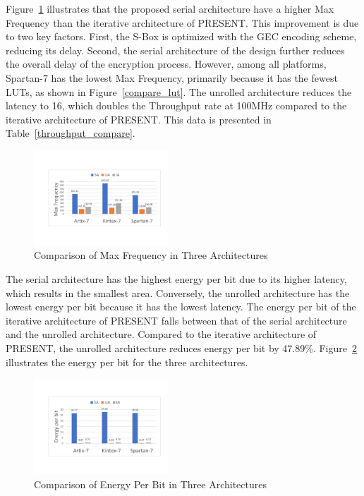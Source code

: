 \documentclass[final,5p,times,twocolumn]{elsarticle}
\begin{document}
Figure~\ref{compare-maxF} illustrates that the proposed serial architecture have a higher Max Frequency than the iterative architecture of PRESENT. This improvement is due to two key factors. First, the S-Box is optimized with the GEC encoding scheme, reducing its delay. Second, the serial architecture of the design further reduces the overall delay of the encryption process. However, among all platforms, Spartan-7 has the lowest Max Frequency, primarily because it has the fewest LUTs, as shown in Figure~\ref{compare_lut}. The unrolled architecture reduces the latency to 16, which doubles the Throughput rate at 100MHz compared to the iterative architecture of PRESENT. This data is presented in Table~\ref{throughput_compare}.

\begin{figure}
    \centering
    \includegraphics[width=0.45\textwidth]{./fig/compare-maxf.pdf}
    \caption{Comparison of Max Frequency in Three Architectures}\label{compare-maxF}
\end{figure}

The serial architecture has the highest energy per bit due to its higher latency, which results in the smallest area. Conversely, the unrolled architecture has the lowest energy per bit because it has the lowest latency. The energy per bit of the iterative architecture of PRESENT falls between that of the serial architecture and the unrolled architecture. Compared to the iterative architecture of PRESENT, the unrolled architecture reduces energy per bit by 47.89\%. Figure~\ref{compare-energy} illustrates the energy per bit for the three architectures.

\begin{figure}
    \centering
    \includegraphics[width=0.45\textwidth]{./fig/compare-energy.pdf}
    \caption{Comparison of Energy Per Bit in Three Architectures}\label{compare-energy}
\end{figure}
\end{document}
